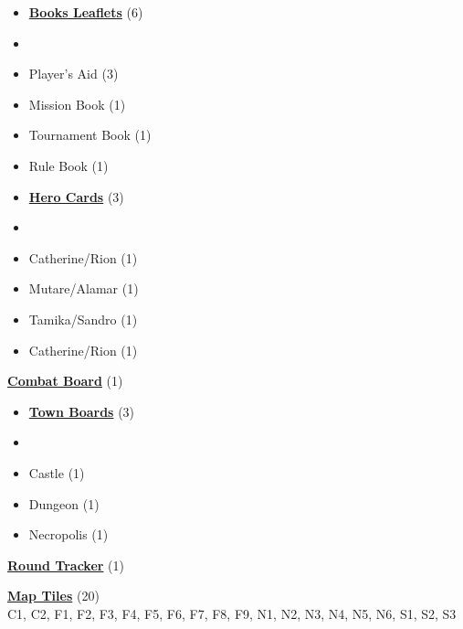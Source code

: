

\begin{multicols*}{3}

\footnotesize

\begin{itemize}[leftmargin=0pt, label={}, noitemsep]
  \item \textbf{\small{\underline{Books Leaflets}}} (6)
  \item
  \item Player's Aid (3)
  \item Mission Book (1)
  \item Tournament Book (1)
  \item Rule Book (1)
\end{itemize}

\begin{itemize}[leftmargin=0pt, label={}, noitemsep]
  \item \textbf{\small{\underline{Hero Cards}}} (3)
  \item
  \item Catherine/Rion (1)
  \item Mutare/Alamar (1)
  \item Tamika/Sandro (1)
  \item Catherine/Rion (1)
\end{itemize}

\textbf{\small{\underline{Combat Board}}} (1)

\begin{itemize}[leftmargin=0pt, label={}, noitemsep]
  \item \textbf{\small{\underline{Town Boards}}} (3)
  \item
  \item Castle (1)
  \item Dungeon (1)
  \item Necropolis (1)
\end{itemize}

\textbf{\small{\underline{Round Tracker}}} (1)

\textbf{\small{\underline{Map Tiles}}} (20)\\

C1, C2, F1, F2, F3, F4, F5, F6, F7, F8, F9, N1, N2, N3, N4, N5, N6, S1, S2, S3


\end{multicols*}

